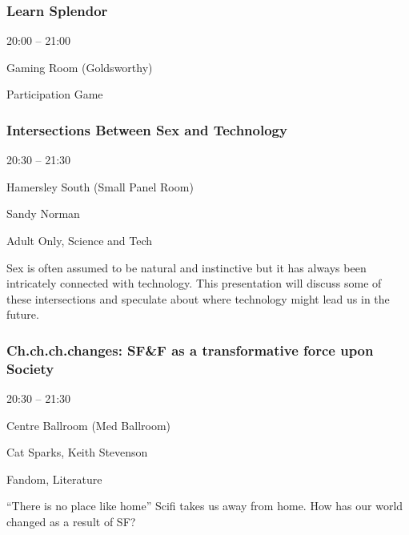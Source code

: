 \documentclass{scrreprt}
\begin{document}
\begin{multicols}{2}
\subsubsection*{Learn Splendor}\begin{description}
\setlength{\itemsep}{0pt}
\setlength{\parsep}{0pt}
\setlength{\parskip}{0pt}
\item[Time:]{20:00 -- 21:00}
\item[Venue:]{Gaming Room (Goldsworthy)}
\item[Tags:]{Participation Game}\end{description}

\subsubsection*{Intersections Between Sex and Technology}\begin{description}
\setlength{\itemsep}{0pt}
\setlength{\parsep}{0pt}
\setlength{\parskip}{0pt}
\item[Time:]{20:30 -- 21:30}
\item[Venue:]{Hamersley South (Small Panel Room)}
\item[People:]{Sandy Norman}
\item[Tags:]{Adult Only, Science and Tech}\end{description}
Sex is often assumed to be natural and instinctive but it has always been intricately connected with technology. This presentation will discuss some of these intersections and speculate about where technology might lead us in the future.
\subsubsection*{Ch.ch.ch.changes: SF\&F as a transformative force upon Society}\begin{description}
\setlength{\itemsep}{0pt}
\setlength{\parsep}{0pt}
\setlength{\parskip}{0pt}
\item[Time:]{20:30 -- 21:30}
\item[Venue:]{Centre Ballroom (Med Ballroom)}
\item[People:]{Cat Sparks, Keith Stevenson}
\item[Tags:]{Fandom, Literature}\end{description}
“There is no place like home” Scifi takes us away from home. How has our world changed as a result of SF?

\end{multicols}
\end{document}
